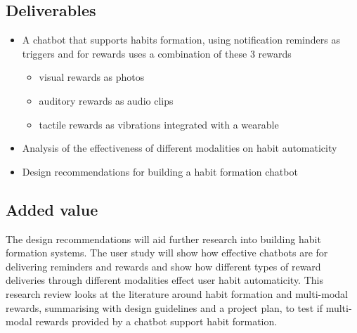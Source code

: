\subsection*{Deliverables}
\begin{itemize}
  \item A chatbot that supports habits formation, using notification reminders as triggers and for rewards uses a combination of these 3 rewards
    \begin{itemize}
      \item visual rewards as photos
      \item auditory rewards as audio clips
      \item tactile rewards as vibrations integrated with a wearable
    \end{itemize}
  \item Analysis of the effectiveness of different modalities on habit automaticity
  \item Design recommendations for building a habit formation chatbot
\end{itemize}

\subsection*{Added value}
The design recommendations will aid further research into building habit formation systems. The user study will show how effective chatbots are for delivering reminders and rewards and show how different types of reward deliveries through different modalities effect user habit automaticity.\newline
\newline
This research review looks at the literature around habit formation and multi-modal rewards, summarising with design guidelines and a project plan, to test if multi-modal rewards provided by a chatbot support habit formation.

\newpage

